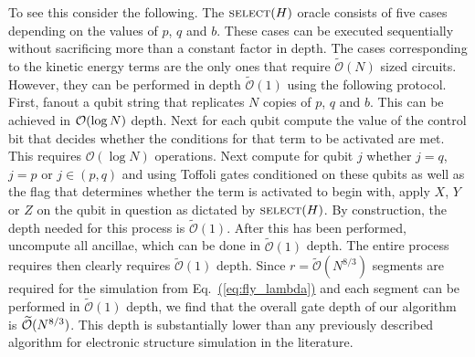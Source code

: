 \documentclass[superscriptaddress,aps,pra,nofootinbib,notitlepage,10pt,longbibliography]{revtex4-1}
\newcommand{\eq}[1]{Eq.~\hyperref[eq:#1]{(\ref*{eq:#1})}}
\begin{document}
To see this consider the following.  The $\textsc{select}(H)$ oracle consists of five cases depending on the values of $p$, $q$ and $b$.  These cases can be executed sequentially without sacrificing more than a constant factor in depth. The cases corresponding to the kinetic energy terms are the only ones that require $\widetilde{\mathcal{O}}(N)$ sized circuits.  However, they can be performed in depth $\widetilde{\mathcal{O}}(1)$ using the following protocol.  First, fanout a qubit string that replicates $N$ copies of $p$, $q$ and $b$.  This can be achieved in ${\cal O}(\log N)$ depth.  Next for each qubit compute the value of the control bit that decides whether the conditions for that term to be activated are met.  This requires $\mathcal{O}(\log N)$ operations.  Next compute for qubit $j$ whether $j=q$, $j=p$ or $j\in (p,q)$ and using Toffoli gates conditioned on these qubits as well as the flag that determines whether the term is activated to begin with, apply $X$, $Y$ or $Z$ on the qubit in question as dictated by $\textsc{select}(H)$.  By construction, the depth needed for this process is $\widetilde{\mathcal{O}}(1)$. After this has been performed, uncompute all ancillae, which can be done in $\widetilde{\mathcal{O}}(1)$ depth.  The entire process requires then clearly requires $\widetilde{\mathcal{O}}(1)$ depth. Since $r=\widetilde{\mathcal{O}}(N^{8/3})$ segments are required for the simulation from \eq{fly_lambda} and each segment can be performed in $\widetilde{\mathcal{O}}(1)$ depth, we find that the overall gate depth of our algorithm is $\widetilde{\cal O}(N^{8/3})$. This depth is substantially lower than any previously described algorithm for electronic structure simulation in the literature.
\end{document}
